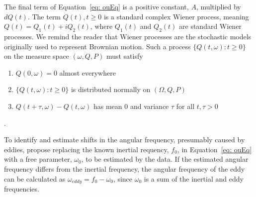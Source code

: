 \documentclass{stat572Style}
\begin{document}
 The final term of Equation~\ref{eq: ouEq} is a positive constant, $A$, multiplied by $dQ(t)$.  The term $Q(t), t \geq 0$ is a standard complex Wiener process,  meaning $Q(t) = Q_{1}(t) + i Q_{2}(t)$, where $Q_{1}(t)$ and $Q_{2}(t)$ are standard Wiener processes.
 We remind the reader that Wiener processes are the stochastic models originally used to represent Brownian motion. 
  Such a process $\{Q(t, \omega): t \geq 0\}$ on the measure space $(\omega, Q, P)$ must satisfy
\begin{enumerate}
\item $Q(0, \omega) = 0$ almost everywhere
\item $\{Q(t, \omega): t \geq 0\}$ is distributed normally on $(\Omega,Q, P)$
\item $Q(t + \tau, \omega) - Q(t, \omega)$ has mean 0 and variance $\tau$ for all $t, \tau > 0$
\end{enumerate}
\citep{Hida1980}. 

To identify and estimate shifts in the angular frequency, presumably caused by eddies, \citet{Sykulski2016} propose replacing the known inertial requency, $f_{0}$,  in Equation~\ref{eq: ouEq} with  a free parameter, $\omega_{0}$, to be estimated by the data. 
If the estimated angular frequency differs from the inertial frequency, the angular frequency of the eddy can be calculated as $\omega_{eddy} = f_{0} - \omega_{0}$, since $\omega_{0}$ is a sum of the inertial and eddy frequencies.
\end{document}
